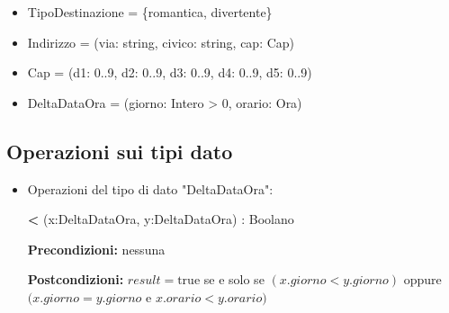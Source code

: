 \documentclass[a4paper]{scrartcl}
\begin{document}
\begin{itemize}
    \item TipoDestinazione = \{romantica, divertente\}
    \item Indirizzo = (via: string, civico: string, cap: Cap)
    \item Cap = (d1: 0..9, d2: 0..9, d3: 0..9, d4: 0..9, d5: 0..9)
    \item DeltaDataOra = (giorno: Intero > 0, orario: Ora)
\end{itemize}

\subsection{Operazioni sui tipi dato}
\begin{itemize}
    \item {Operazioni del tipo di dato "DeltaDataOra":}
    
    \textbf{<} (x:DeltaDataOra, y:DeltaDataOra) : Boolano
    
    \textbf{Precondizioni:} nessuna
    
    \textbf{Postcondizioni:} 
    $result = \text{true}$ se e solo se $(x.giorno < y.giorno)$ oppure $(x.giorno = y.giorno$ e $x.orario < y.orario)$
\end{itemize}

\end{document}
